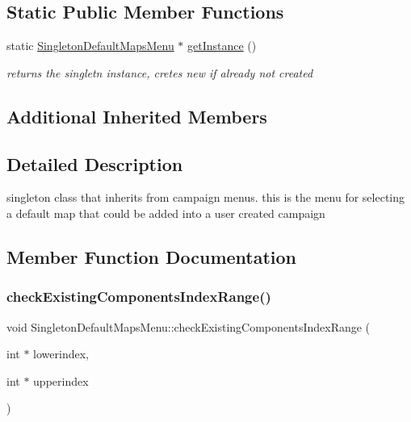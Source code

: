 \subsection*{Static Public Member Functions}
\begin{DoxyCompactItemize}
\item 
\hypertarget{class_singleton_default_maps_menu_a812f7d4f2134b770def8a32b9a67416f}{}\label{class_singleton_default_maps_menu_a812f7d4f2134b770def8a32b9a67416f} 
static \hyperlink{class_singleton_default_maps_menu}{Singleton\+Default\+Maps\+Menu} $\ast$ \hyperlink{class_singleton_default_maps_menu_a812f7d4f2134b770def8a32b9a67416f}{get\+Instance} ()
\begin{DoxyCompactList}\small\item\em returns the singletn instance, cretes new if already not created \end{DoxyCompactList}\end{DoxyCompactItemize}
\subsection*{Additional Inherited Members}


\subsection{Detailed Description}
singleton class that inherits from campaign menus. this is the menu for selecting a default map that could be added into a user created campaign 

\subsection{Member Function Documentation}
\hypertarget{class_singleton_default_maps_menu_aa8c2183626eac2346c15259a4c9a5093}{}\label{class_singleton_default_maps_menu_aa8c2183626eac2346c15259a4c9a5093} 
\subsubsection{\texorpdfstring{check\+Existing\+Components\+Index\+Range()}{checkExistingComponentsIndexRange()}}
{\footnotesize\ttfamily void Singleton\+Default\+Maps\+Menu\+::check\+Existing\+Components\+Index\+Range (\begin{DoxyParamCaption}\item[{int $\ast$}]{lowerindex,  }\item[{int $\ast$}]{upperindex }\end{DoxyParamCaption})\hspace{0.3cm}{\ttfamily [virtual]}}

